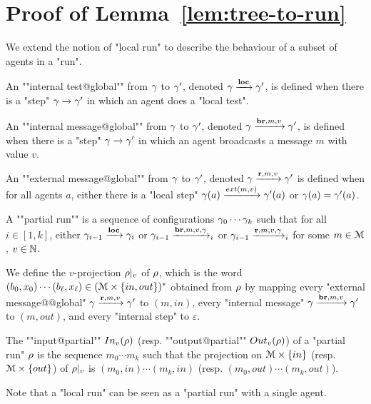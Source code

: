 \section{Proof of Lemma~\ref{lem:tree-to-run}}

\begin{definition}
	We extend the notion of "local run" to describe the behaviour of a subset of agents in a "run".
	
	An ""internal test@global"" from $\gamma$ to $\gamma'$, denoted $\gamma \xrightarrow{\textbf{loc}} \gamma'$, is defined when there is a "step" $\gamma \xrightarrow{} \gamma'$ in which an agent does a "local test". 
	
	An ""internal message@global"" from $\gamma$ to $\gamma'$, denoted $\gamma \xrightarrow{\textbf{br}, m, v} \gamma'$, is defined when there is a "step" $\gamma \xrightarrow{} \gamma'$ in which an agent broadcasts a message $m$ with value $v$. 
	
	An ""external message@global"" from $\gamma$ to $\gamma'$, denoted $\gamma \xrightarrow{\textbf{r}, m, v} \gamma'$ is defined when for all agents $a$, either there is a "local step" $\config(a) \extbr{m}{v} \config'(a)$ or $\gamma(a) = \gamma'(a)$.
	
	A ""partial run"" is a sequence of configurations $\gamma_0 \cdots \gamma_k$  such that for all $i \in [1, k]$, either $\gamma_{i-1} \xrightarrow{\textbf{loc}} \gamma_{i}$ or $\gamma_{i-1} \xrightarrow{\textbf{br}, m, v, \gamma}_{i}$ or $\gamma_{i-1} \xrightarrow{\textbf{r}, m, v, \gamma}_{i}$ for some $m \in \mathcal{M}$, $v\in \mathbb{N}$. 
	
	We define the $v$-projection ${\rho}|_{v}$ of $\rho$, which is the word $(b_0, x_0) \cdots (b_\ell, x_\ell) \in (\mathcal{M} \times \{in, out\})^*$ obtained from $\rho$ by mapping every "external message@@global" $\gamma \xrightarrow{\textbf{r}, m, v} \gamma'$ to $(m, in)$, every "internal message" $\gamma \xrightarrow{\textbf{br}, m, v} \gamma'$ to $(m, out)$, and every "internal step" to $\varepsilon$.
	
	The ""input@partial"" $\vinput{v}{\run}$ (resp. ""output@partial"" $\voutput{v}{\run}$) of a "partial run" $\rho$ is the sequence $m_0 \cdots m_k$ such that the projection on $\mathcal{M} \times \{in\}$ (resp. $\mathcal{M}\times \{out\}$) of ${\rho}|_{v}$ is $(m_0, in) \cdots (m_k, in)$ (resp. $(m_0, out)\cdots(m_k, out)$).
	
	Note that a "local run" can be seen as a "partial run" with a single agent.
\end{definition}


